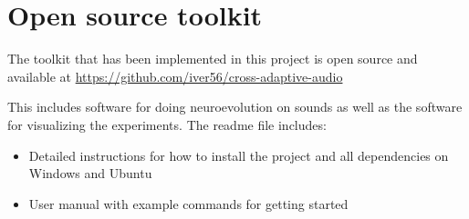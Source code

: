 
\chapter{Open source toolkit}
\label{appendix:toolkit}
The toolkit that has been implemented in this project is open source and available at \hfill \break
\url{https://github.com/iver56/cross-adaptive-audio}

This includes software for doing neuroevolution on sounds as well as the software for visualizing the experiments. The readme file includes:

\begin{itemize}
\item Detailed instructions for how to install the project and all dependencies on Windows and Ubuntu
\item User manual with example commands for getting started
\end{itemize}
